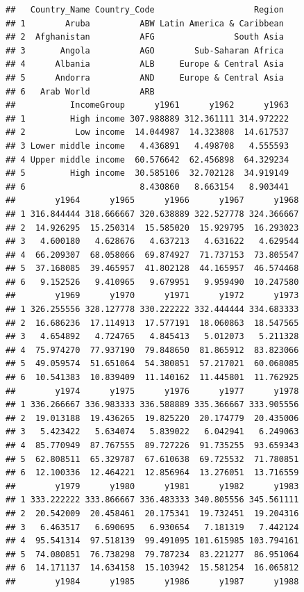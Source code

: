 \documentclass[
]{book}
\begin{document}
\begin{verbatim}
##   Country_Name Country_Code                    Region
## 1        Aruba          ABW Latin America & Caribbean
## 2  Afghanistan          AFG                South Asia
## 3       Angola          AGO        Sub-Saharan Africa
## 4      Albania          ALB     Europe & Central Asia
## 5      Andorra          AND     Europe & Central Asia
## 6   Arab World          ARB                          
##           IncomeGroup      y1961      y1962      y1963
## 1         High income 307.988889 312.361111 314.972222
## 2          Low income  14.044987  14.323808  14.617537
## 3 Lower middle income   4.436891   4.498708   4.555593
## 4 Upper middle income  60.576642  62.456898  64.329234
## 5         High income  30.585106  32.702128  34.919149
## 6                       8.430860   8.663154   8.903441
##        y1964      y1965      y1966      y1967      y1968
## 1 316.844444 318.666667 320.638889 322.527778 324.366667
## 2  14.926295  15.250314  15.585020  15.929795  16.293023
## 3   4.600180   4.628676   4.637213   4.631622   4.629544
## 4  66.209307  68.058066  69.874927  71.737153  73.805547
## 5  37.168085  39.465957  41.802128  44.165957  46.574468
## 6   9.152526   9.410965   9.679951   9.959490  10.247580
##        y1969      y1970      y1971      y1972      y1973
## 1 326.255556 328.127778 330.222222 332.444444 334.683333
## 2  16.686236  17.114913  17.577191  18.060863  18.547565
## 3   4.654892   4.724765   4.845413   5.012073   5.211328
## 4  75.974270  77.937190  79.848650  81.865912  83.823066
## 5  49.059574  51.651064  54.380851  57.217021  60.068085
## 6  10.541383  10.839409  11.140162  11.445801  11.762925
##        y1974      y1975      y1976      y1977      y1978
## 1 336.266667 336.983333 336.588889 335.366667 333.905556
## 2  19.013188  19.436265  19.825220  20.174779  20.435006
## 3   5.423422   5.634074   5.839022   6.042941   6.249063
## 4  85.770949  87.767555  89.727226  91.735255  93.659343
## 5  62.808511  65.329787  67.610638  69.725532  71.780851
## 6  12.100336  12.464221  12.856964  13.276051  13.716559
##        y1979      y1980      y1981      y1982      y1983
## 1 333.222222 333.866667 336.483333 340.805556 345.561111
## 2  20.542009  20.458461  20.175341  19.732451  19.204316
## 3   6.463517   6.690695   6.930654   7.181319   7.442124
## 4  95.541314  97.518139  99.491095 101.615985 103.794161
## 5  74.080851  76.738298  79.787234  83.221277  86.951064
## 6  14.171137  14.634158  15.103942  15.581254  16.065812
##        y1984      y1985      y1986      y1987      y1988

\end{verbatim}
\end{document}
